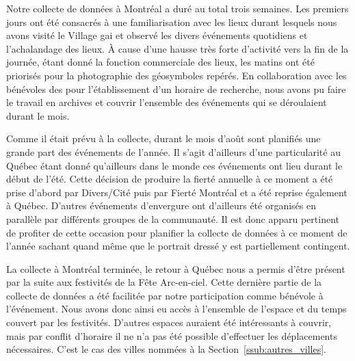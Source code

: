 Notre collecte de données à Montréal a duré au total trois semaines. 
Les premiers jours ont été consacrés à une familiarisation avec les lieux durant lesquels nous avons visité le Village gai et observé les divers événements quotidiens et l'achalandage des lieux. 
À cause d'une hausse très forte d'activité vers la fin de la journée, étant donné la fonction commerciale des lieux, les matins ont été priorisés pour la photographie des géosymboles repérés. 
En collaboration avec les bénévoles des \agq{} pour l'établissement d'un horaire de recherche, nous avons pu faire le travail en archives et couvrir l'ensemble des événements \lgbt{} qui se déroulaient durant le mois. 

Comme il était prévu à la collecte, durant le mois d'août sont planifiés une grande part des événements \lgbt{} de l'année. 
Il s'agit d'ailleurs d'une particularité au Québec étant donné qu'ailleurs dans le monde ces événements ont lieu durant le début de l'été. 
Cette décision de produire la fierté annuelle à ce moment a été prise d'abord par Divers/Cité puis par Fierté Montréal et a été reprise également à Québec. 
D'autres événements d'envergure ont d'ailleurs été organisés en parallèle par différents groupes de la communauté. 
Il est donc apparu pertinent de profiter de cette occasion pour planifier la collecte de données à ce moment de l'année sachant quand même que le portrait dressé y est partiellement contingent. 

La collecte à Montréal terminée, le retour à Québec nous a permis d'être présent par la suite aux festivités de la Fête Arc-en-ciel. 
Cette dernière partie de la collecte de données a été facilitée par notre participation comme bénévole à l'événement. 
Nous avons donc ainsi eu accès à l'ensemble de l'espace et du temps couvert par les festivités. 
D'autres espaces auraient été intéressants à couvrir, mais par conflit d'horaire il ne n'a pas été possible d'effectuer les déplacements nécessaires. 
C'est le cas des villes nommées à la Section~\ref{ssub:autres_villes}.


